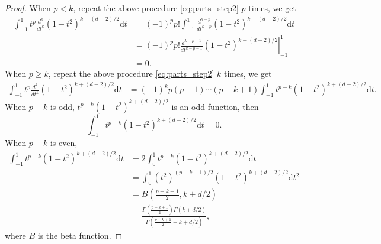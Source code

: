\begin{proof}
When $p<k$, repeat the above procedure \eqref{eq:parts_step2} $p$ times, we get
\begin{align}
    \int_{-1}^1 t^p\frac{d^k}{dt^k}(1-t^2)^{k+(d-2)/2}\mathrm{d}t&=(-1)^p p!\int_{-1}^1 \frac{d^{k-p}}{dt^{k-p}}(1-t^2)^{k+(d-2)/2}\mathrm{d}t \nonumber\\
    &=(-1)^p p!\left. \frac{d^{k-p-1}}{dt^{k-p-1}}(1-t^2)^{k+(d-2)/2}\right|_{-1}^1 \nonumber\\
    &=0.
    \label{eq:p<k}
\end{align}
When $p\geq k$, repeat the above procedure \eqref{eq:parts_step2} $k$ times, we get
\begin{align}
    \int_{-1}^1 t^p\frac{d^k}{dt^k}(1-t^2)^{k+(d-2)/2}\mathrm{d}t&=(-1)^k p(p-1)\cdots(p-k+1)\int_{-1}^1 t^{p-k} (1-t^2)^{k+(d-2)/2}\mathrm{d}t.
    \label{eq:r>=k}
\end{align}
When $p-k$ is odd, $t^{p-k} (1-t^2)^{k+(d-2)/2}$ is an odd function, then 
\begin{equation}
    \int_{-1}^1 t^{p-k} (1-t^2)^{k+(d-2)/2}\mathrm{d}t=0.
    \label{eq:odd_case}
\end{equation}
When $p-k$ is even, 
\begin{align}
    \int_{-1}^1 t^{p-k} (1-t^2)^{k+(d-2)/2}\mathrm{d}t&=2\int_{0}^1 t^{p-k} (1-t^2)^{k+(d-2)/2}\mathrm{d}t \nonumber\\
    &=\int_{0}^1 (t^2)^{(p-k-1)/2} (1-t^2)^{k+(d-2)/2}\mathrm{d}t^2 \nonumber\\
    &=B\left(\frac{p-k+1}{2}, k+d/2\right) \nonumber\\
    &=\frac{\Gamma(\frac{p-k+1}{2})\Gamma(k+d/2)}{\Gamma(\frac{p-k+1}{2}+k+d/2)}\label{eq:even_case},
\end{align}
where $B$ is the beta function.


\end{proof}
